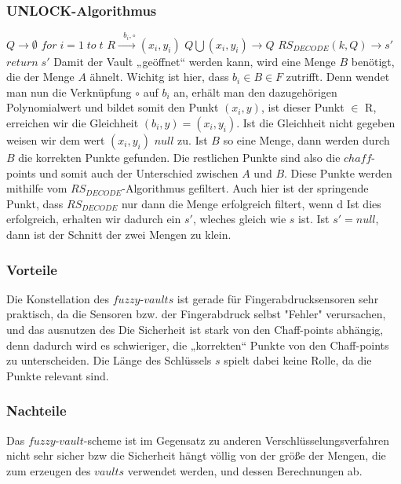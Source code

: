 \documentclass[12pt,a4paper]{article}
\begin{document}
\subsubsection{UNLOCK-Algorithmus}
\hspace*{10mm}$ Q \rightarrow \emptyset$ \newline
\hspace*{10mm}$for \; i=1 \; to \; t $\newline
\hspace*{15mm}$R \xrightarrow{\text{ $b_{i}, \circ $}} (x_{i}, y_{i})$\newline
\hspace*{15mm}$Q\bigcup (x_{i},y_{i}) \rightarrow Q$\newline
\hspace*{10mm}$RS_{DECODE}(k,Q) \rightarrow s'$\newline
\hspace*{10mm}$return\; s' $\newline
\newline
Damit der Vault „geöffnet“ werden kann, wird eine Menge $B$ benötigt, die der Menge $A$ ähnelt. Wichitg ist hier, dass $b_{i} \in B \in F$ zutrifft. Denn wendet man nun die Verknüpfung $\circ$ auf $b_{i}$ an, erhält man den dazugehörigen Polynomialwert und bildet somit den Punkt $(x_{i},y)$, ist dieser Punkt $\in$ R, erreichen wir die Gleichheit $(b_{i},y) = (x_{i},y_{i})$. Ist die Gleichheit nicht gegeben weisen wir dem wert $(x_{i},y_{i})$ $null$ zu. Ist $B$ so eine Menge, dann werden durch $B$ die korrekten Punkte gefunden. Die restlichen Punkte sind also die $chaff$-points und somit auch der Unterschied zwischen $A$ und $B$. Diese Punkte werden mithilfe vom $RS_{DECODE}$-Algorithmus gefiltert. Auch hier ist der springende Punkt, dass $RS_{DECODE}$ nur dann die Menge erfolgreich filtert, wenn d Ist dies erfolgreich, erhalten wir dadurch ein $s'$, wleches gleich wie $s$ ist. Ist $s' = null$, dann ist der Schnitt der zwei Mengen zu klein.

\cite{michigan}
\subsubsection{Vorteile}
Die Konstellation des $fuzzy$-$vaults$ ist gerade für Fingerabdrucksensoren sehr praktisch, da die Sensoren bzw. der Fingerabdruck selbst "Fehler" verursachen, und das ausnutzen des 
Die Sicherheit ist stark von den Chaff-points abhängig, denn dadurch wird es schwieriger, die „korrekten“ Punkte von den Chaff-points zu unterscheiden. Die Länge des Schlüssels $s$ spielt dabei keine Rolle, da die Punkte relevant sind.
\subsubsection{Nachteile}
Das $fuzzy$-$vault$-scheme ist im Gegensatz zu anderen Verschlüsselungsverfahren nicht sehr sicher bzw die Sicherheit hängt völlig von der größe der Mengen, die zum erzeugen des $vaults$ verwendet werden, und dessen Berechnungen ab.  


\end{document}
